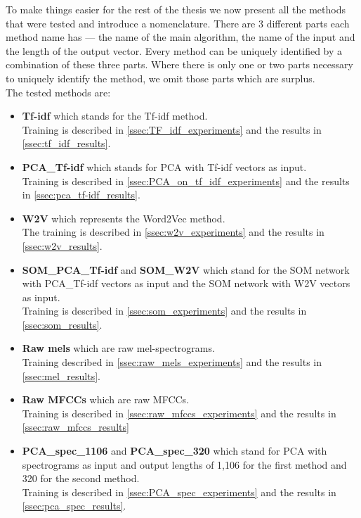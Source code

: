 To make things easier for the rest of the thesis we now present all the methods that were tested and introduce a nomenclature. There are 3 different
parts each method name has --- the name of the main algorithm, the name of the input and the length of the output vector. Every method can be uniquely 
identified by a combination of these three parts. Where there is only one or
two parts necessary to uniquely identify the method, we omit those parts which are surplus. \\
The tested methods are:
\renewcommand\labelitemii{\textperiodcentered}
\begin{itemize}
     \item \textbf{Tf-idf} which stands for the Tf-idf method. \\
        Training is described in \ref{ssec:TF_idf_experiments} and the results in \ref{ssec:tf_idf_results}.
    \item \textbf{PCA\_Tf-idf} which stands for PCA with Tf-idf vectors as input. \\
    Training is described in \ref{ssec:PCA_on_tf_idf_experiments} and the results in \ref{ssec:pca_tf-idf_results}.
    \item \textbf{W2V} which represents the Word2Vec method. \\
        The training is described in \ref{ssec:w2v_experiments} and the results in \ref{ssec:w2v_results}.
    \item \textbf{SOM\_PCA\_Tf-idf} and \textbf{SOM\_W2V} which stand for the SOM network with PCA\_Tf-idf vectors as input and the SOM network with W2V vectors as input. \\
            Training is described in \ref{ssec:som_experiments} and the results in \ref{ssec:som_results}.
    \item \textbf{Raw mels} which are raw mel-spectrograms. \\
             Training described in \ref{ssec:raw_mels_experiments} and the results in \ref{ssec:mel_results}.
    \item \textbf{Raw MFCCs} which are raw MFCCs. \\
        Training is described in \ref{ssec:raw_mfccs_experiments} and the results in \ref{ssec:raw_mfccs_results}
    \item \textbf{PCA\_spec\_1106} and \textbf{PCA\_spec\_320} which stand for PCA with spectrograms as input and output lengths of 1,106 for the first method and 320 for the second method. \\
        Training is described in \ref{ssec:PCA_spec_experiments} and the results in \ref{ssec:pca_spec_results}.

\end{itemize}
